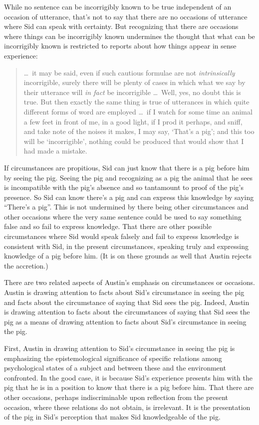 While no sentence can be incorrigibly known to be true independent of an occasion of utterance, that's not to say that there are no occasions of utterance where Sid can speak with certainty. But recognizing that there are occasions where things can be incorrigibly known undermines the thought that what can be incorrigibly known is restricted to reports about how things appear in sense experience:
\begin{quote}
    \ldots\ it may be said, even if such cautious formulae are not \emph{intrinsically} incorrigible, surely there will be plenty of cases in which what we say by their utterance will \emph{in fact} be incorrigible \ldots\ Well, yes, no doubt this is true. But then exactly the same thing is true of utterances in which quite different forms of word are employed \ldots\ if I watch for some time an animal a few feet in front of me, in a good light, if I prod it perhaps, and sniff, and take note of the noises it makes, I may say, `That’s a pig’; and this too will be `incorrigible’, nothing could be produced that would show that I had made a mistake. \citep[114--5]{Austin:1962lr}
\end{quote}
If circumstances are propitious, Sid can just know that there is a pig before him by seeing the pig. Seeing the pig and recognizing as a pig the animal that he sees is incompatible with the pig's absence and so tantamount to proof of the pig's presence. So Sid can know there's a pig and can express this knowledge by saying ``There's a pig''. This is not undermined by there being other circumstances and other occasions where the very same sentence could be used to say something false and so fail to express knowledge. That there are other possible circumstances where Sid would speak falsely and fail to express knowledge is consistent with Sid, in the present circumstances, speaking truly and expressing knowledge of a pig before him. (It is on these grounds as well that Austin rejects the accretion.)

There are two related aspects of Austin's emphasis on circumstances or occasions. Austin is drawing attention to facts about Sid's circumstance in seeing the pig and facts about the circumstance of saying that Sid sees the pig. Indeed, Austin is drawing attention to facts about the circumstances of saying that Sid sees the pig as a means of drawing attention to facts about Sid's circumstance in seeing the pig.

First, Austin in drawing attention to Sid's circumstance in seeing the pig is emphasizing the epistemological significance of specific relations among psychological states of a subject and between these and the environment confronted. In the good case, it is because Sid's experience presents him with the pig that he is in a position to know that there is a pig before him. That there are other occasions, perhaps indiscriminable upon reflection from the present occasion, where these relations do not obtain, is irrelevant. It is the presentation of the pig in Sid's perception that makes Sid knowledgeable of the pig. 

